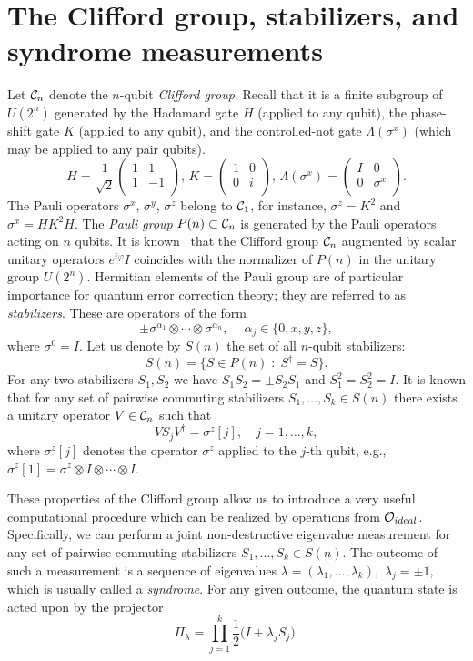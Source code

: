 \documentclass[pra,twocolumn,showpacs]{revtex4}
\newcommand{\calO}{{\cal O }}
\newcommand*{\Cl}[1]{{\cal C}_{#1}}
\newcommand{\sx}{\sigma^x}
\newcommand{\sy}{\sigma^y}
\newcommand{\sz}{\sigma^z}
\newcommand{\ba}{\begin{array}}
\newcommand{\ea}{\end{array}}
\begin{document}
\section{\label{sec:Clifford} The Clifford group, stabilizers, and
syndrome  measurements}

Let $\Cl{n}$ denote the $n$-qubit \emph{Clifford group}. Recall that it is a
finite subgroup of $U(2^n)$ generated by the Hadamard gate $H$ (applied to any qubit),
the phase-shift gate $K$ (applied to any qubit), and the controlled-not gate
$\Lambda(\sx)$ (which may be applied to any pair qubits).
\begin{equation}\label{gates} H= \frac1{\sqrt{2}}\left(
\ba{cc} 1& 1 \\ 1 & -1 \\ \ea \right),\, K=\left( \ba{cc} 1 & 0 \\ 0 & i \\
\ea \right),\, \Lambda(\sx)=\left( \ba{cc} I & 0 \\ 0 & \sx \\ \ea \right).
\end{equation}
The Pauli operators $\sx$, $\sy$, $\sz$ belong to $\Cl{1}$, for instance,
$\sz=K^2$ and $\sx=H K^2 H$. The \emph{Pauli group} $P(n)\subset \Cl{n}$ is
generated by the Pauli operators acting on $n$ qubits. It is
known~\cite{orthogeom} that the Clifford group $\Cl{n}$ augmented by scalar
unitary operators $e^{i\varphi} I$ coincides with the normalizer of $P(n)$ in
the unitary group $U(2^n)$.  Hermitian elements of the Pauli group are of
particular importance for quantum error correction theory; they are referred
to as {\it stabilizers}. These are operators of the form
\[
\pm \sigma^{\alpha_{1}}\otimes\cdots\otimes\sigma^{\alpha_{n}},
\quad\ \alpha_{j}\in\{0,x,y,z\},
\]
where $\sigma^{0}=I$.  Let us denote by $S(n)$ the set of all $n$-qubit
stabilizers:
\[
S(n)=\{ S\in P(n) \; : \; S^\dag=S\}.
\]
For any two stabilizers $S_1, S_2$ we have $S_1 S_2 = \pm S_2 S_1$ and
$S_1^2=S_2^2=I$. It is known that for any set of pairwise commuting
stabilizers $S_1,\ldots,S_k \in S(n)$ there exists a unitary operator $V\in
\Cl{n}$ such that
\[
V S_j V^\dag = \sz[j], \quad j=1,\ldots, k,
\]
where $\sz[j]$ denotes the operator $\sz$ applied to the $j$-th qubit,
e.g., $\sz[1]=\sz\otimes I \otimes \cdots \otimes I$. 

These properties of the Clifford group allow us to introduce a very useful
computational procedure which can be realized by operations from
$\calO_{ideal}$. Specifically, we can perform a joint non-destructive
eigenvalue measurement for any set of pairwise commuting stabilizers
$S_1,\ldots, S_k \in S(n)$.  The outcome of such a measurement is a sequence
of eigenvalues $\lambda=(\lambda_1,\ldots, \lambda_k)$,\, $\lambda_j = \pm 1$,
which is usually called a {\it syndrome}. For any given outcome, the quantum
state is acted upon by the projector
\[
\Pi_\lambda = \prod_{j=1}^k \frac12 \bigl(I + \lambda_j S_j \bigr).
\]
\end{document}
